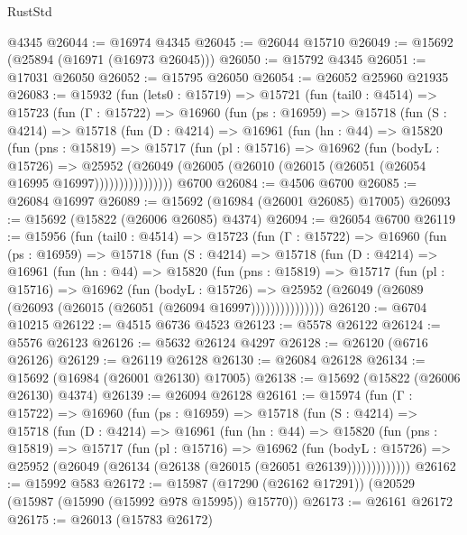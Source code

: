 \begin{lexlean}{RustStd}
\begin{coremodule}
    @4345
@26044 := @16974 @4345
@26045 := @26044 @15710
@26049 := @15692 (@25894 (@16971 (@16973 @26045)))
@26050 := @15792 @4345
@26051 := @17031 @26050
@26052 := @15795 @26050
@26054 := @26052 @25960 @21935
@26083 := @15932
    (fun (lets0 : @15719) =>
    @15721
      (fun (tail0 : @4514) =>
      @15723
        (fun (Γ : @15722) =>
        @16960
          (fun (ps : @16959) =>
          @15718
            (fun (S : @4214) =>
            @15718
              (fun (D : @4214) =>
              @16961
                (fun (hn : @44) =>
                @15820
                  (fun (pns : @15819) =>
                  @15717
                    (fun (pl : @15716) =>
                    @16962
                      (fun (bodyL : @15726) =>
                      @25952
                        (@26049
                          (@26005 (@26010 (@26015 (@26051 (@26054 @16995 @16997))))))))))))))))
    @6700
@26084 := @4506 @6700
@26085 := @26084 @16997
@26089 := @15692 (@16984 (@26001 @26085) @17005)
@26093 := @15692 (@15822 (@26006 @26085) @4374)
@26094 := @26054 @6700
@26119 := @15956
    (fun (tail0 : @4514) =>
    @15723
      (fun (Γ : @15722) =>
      @16960
        (fun (ps : @16959) =>
        @15718
          (fun (S : @4214) =>
          @15718
            (fun (D : @4214) =>
            @16961
              (fun (hn : @44) =>
              @15820
                (fun (pns : @15819) =>
                @15717
                  (fun (pl : @15716) =>
                  @16962
                    (fun (bodyL : @15726) =>
                    @25952 (@26049 (@26089 (@26093 (@26015 (@26051 (@26094 @16997)))))))))))))))
@26120 := @6704 @10215
@26122 := @4515 @6736 @4523
@26123 := @5578 @26122
@26124 := @5576 @26123
@26126 := @5632 @26124 @4297
@26128 := @26120 (@6716 @26126)
@26129 := @26119 @26128
@26130 := @26084 @26128
@26134 := @15692 (@16984 (@26001 @26130) @17005)
@26138 := @15692 (@15822 (@26006 @26130) @4374)
@26139 := @26094 @26128
@26161 := @15974
    (fun (Γ : @15722) =>
    @16960
      (fun (ps : @16959) =>
      @15718
        (fun (S : @4214) =>
        @15718
          (fun (D : @4214) =>
          @16961
            (fun (hn : @44) =>
            @15820
              (fun (pns : @15819) =>
              @15717
                (fun (pl : @15716) =>
                @16962
                  (fun (bodyL : @15726) =>
                  @25952 (@26049 (@26134 (@26138 (@26015 (@26051 @26139)))))))))))))
@26162 := @15992 @583
@26172 := @15987 (@17290 (@26162 @17291)) (@20529 (@15987 (@15990 (@15992 @978 @15995)) @15770))
@26173 := @26161 @26172
@26175 := @26013 (@15783 @26172)

\end{coremodule}
\end{lexlean}

